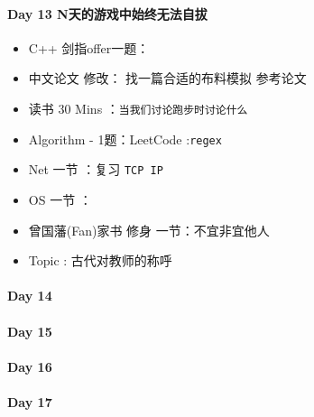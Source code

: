 \documentclass[UTF8,a4paper,8pt]{ctexart}
\begin{document}
 	 \paragraph{Day 13  N天的游戏中始终无法自拔    \quad     }
	 	 \begin{itemize}[itemindent = 1em]
	 	 	\renewcommand\labelitemi{\makebox[0pt][l]{$\square$}\hspace{1em}} 
	 	 	\renewcommand\labelitemi{\makebox[0pt][l]{$\square$}\raisebox{.15ex}{\hspace{0.1em}$\checkmark$}}	 	
	 	 	\item   C++ 剑指offer一题：\verb||
	 	 	\item   中文论文 修改： 找一篇合适的布料模拟 参考论文
	 	 	
	 	 	\item   读书  30 Mins	：\verb|当我们讨论跑步时讨论什么|
	 	 	\item   Algorithm - 1题：LeetCode :\verb|regex|	
	 	 	\item   Net 一节 ：复习 \verb|TCP IP|	
	 	 	\renewcommand\labelitemi{\makebox[0pt][l]{$\square$}\hspace{1em}} 
	 	 	
	 	 	\item   OS  一节 ：
	 	 	
	 	 	\renewcommand\labelitemi{\makebox[0pt][l]{$\square$}\raisebox{.15ex}{\hspace{0.1em}$\checkmark$}}
	 	 	\item   曾国藩(Fan)家书 修身 一节：不宜非宜他人
	 	 	\item   Topic : 古代对教师的称呼
	 	 \end{itemize}
 	 \paragraph{Day 14      \quad     }
 	 \paragraph{Day 15      \quad     }
 	 \paragraph{Day 16      \quad     }
 	 \paragraph{Day 17      \quad     }
\end{document}
